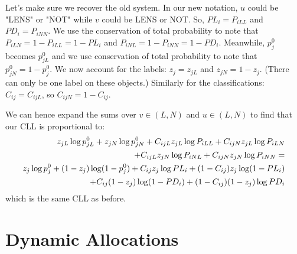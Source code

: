 \documentclass[useAMS,usenatbib,a4paper]{mn2e}
\begin{document}
Let's make sure we recover the old system. In our new notation, $u$ could be
"LENS" or "NOT" while $v$ could be LENS or NOT. So, $PL_i = P_{iLL}$ and $PD_i
= P_{iNN}$. We use the conservation of total probability to note that
$P_{iLN} = 1 - P_{iLL} = 1 - PL_i$ and $P_{iNL} = 1 - P_{iNN} = 1 -
PD_i$. Meanwhile, $p_j^0$ becomes $p_{jL}^0$ and we use conservation of total
probability to note that $p_{jN}^0 = 1 - p_{j}^0$. We now account for the
labels: $z_{j} = z_{jL}$ and $z_{jN} = 1 - z_{j}$. (There can only be one
label on these objects.) Similarly for the classifications: $C_{ij} = C_{ijL}$,
so $C_{ijN} = 1 - C_{ij}$.

We can hence expand the
sums over $v \in (L, N)$ and $u \in (L, N)$ to find that our CLL is
proportional to:
\begin{align}
z_{jL} \log p_{jL}^0 + z_{jN} \log p_{jN}^0 +
C_{ijL} z_{jL} \log P_{iLL} + C_{ijN} z_{jL} \log P_{iLN} \notag\\ + C_{ijL} z_{jN} \log
P_{iNL} + C_{ijN} z_{jN} \log P_{iNN} = \notag\\
z_j \log p_j^0 + (1 - z_j) \log (1 - p_j^0) + C_{ij} z_j \log PL_i + (1 -
C_{ij}) z_j \log (1 - PL_i) \notag\\
+ C_{ij} (1 - z_j) \log (1 - PD_i) + (1 - C_{ij})
(1 - z_j) \log PD_i
\end{align}
which is the same CLL as before.


\section{Dynamic Allocations}
\end{document}
